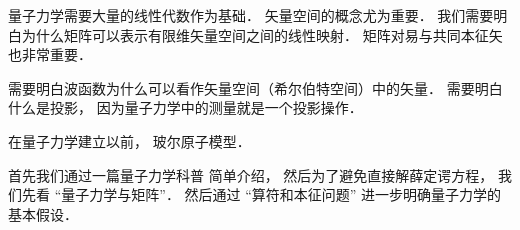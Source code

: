 
\begin{issues}
\issueDraft
\end{issues}

量子力学需要大量的线性代数作为基础． 矢量空间的概念尤为重要． 我们需要明白为什么矩阵可以表示有限维矢量空间之间的线性映射． 矩阵对易与共同本征矢 也非常重要．

需要明白波函数为什么可以看作矢量空间（希尔伯特空间）中的矢量． 需要明白什么是投影， 因为量子力学中的测量就是一个投影操作．



在量子力学建立以前， 玻尔原子模型．

首先我们通过一篇量子力学科普 简单介绍， 然后为了避免直接解薛定谔方程， 我们先看 “量子力学与矩阵”． 然后通过 “算符和本征问题” 进一步明确量子力学的基本假设．
